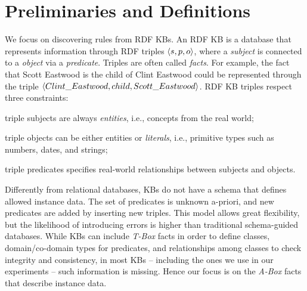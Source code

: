 \section{Preliminaries and Definitions} \label{sec:krd_prel}
We focus on discovering rules from RDF KBs. An RDF KB is
a database that represents information through RDF triples $\langle s,p,o\rangle$, where a \emph{subject} is connected to a \emph{object} via a \emph{predicate}. Triples are often called \emph{facts}. For example, the fact that Scott Eastwood is the child of Clint Eastwood could be represented through the triple $\langle Clint\_Eastwood,child,Scott\_Eastwood\rangle$. 
RDF KB triples respect three constraints:
\begin{inparaenum}[(i)]
	\item triple subjects are always \emph{entities}, i.e., concepts from the real world;
	\item triple objects can be either entities or \emph{literals}, i.e.,  primitive types such as numbers, dates, and strings;
	\item triple predicates specifies real-world relationships between subjects and objects.
\end{inparaenum}

Differently from relational databases, KBs do not have a schema that defines allowed instance data. 
The set of predicates is unknown a-priori, and new predicates are added by inserting new triples. %
This model allows great flexibility, but the likelihood of introducing errors is higher than traditional schema-guided databases.
While KBs can include \emph{T-Box} facts in order to define classes, domain/co-domain types for predicates, and relationships among classes
to check integrity and consistency, in most KBs -- including the ones we use in our experiments -- such information is missing. %
Hence our focus is on the \emph{A-Box} facts that describe instance data. 

